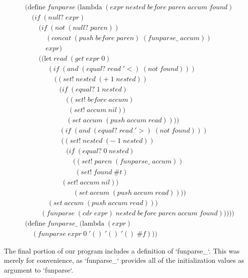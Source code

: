 \begin{align*}
& (\text{define} \; funparse \; (\text{lambda} \; (expr \; nested \; before \; paren \; accum \; found) \; 
\\& \quad (if \; (null? \; expr)
\\& \qquad (if \; (not \; (null? \; paren))
\\& \qquad \quad (concat \; (push \; before \; paren) \; (funparse\_ \; accum))
\\& \qquad \quad expr)
\\& \qquad ((\text{let} \; read \; (get \; expr \; 0)
\\& \qquad \quad \; (if \; (and \; (equal? \; read \; '<) \; (not \; found)))
\\& \qquad \qquad \; ((set! \; nested \; (+ \; 1 \; nested))
\\& \qquad \qquad \quad (if \; (equal? \; 1 \; nested)
\\& \qquad \qquad \qquad ((set! \; before \; accum)
\\& \qquad \qquad \qquad \; (set! \; accum \; nil))
\\& \qquad \qquad \qquad (set \; accum \; (push \; accum \; read))))
\\& \qquad \qquad \quad (if \; (and \; (equal? \; read \; '>) \; (not \; found)))
\\& \qquad \qquad \quad \; ((set! \; nested \; (- \; 1 \; nested))
\\& \qquad \qquad \qquad (if \; (equal? \; 0 \; nested)
\\& \qquad \qquad \qquad \quad ((set! \; paren \; (funparse\_ \; accum))
\\& \qquad \qquad \qquad \quad \; (set! \; found \; \#t)
\\& \qquad \qquad \quad \; (set! \; accum \; nil))
\\& \qquad \qquad \qquad \quad (set \; accum \; (push \; accum \; read))))
\\& \qquad \quad \; (set \; accum \; (push \; accum \; read)))
\\& \qquad \; (funparse \; (cdr \; expr) \; nested \; before \; paren \; accum \; found)))))
\\& (\text{define} \; funparse\_ \; (\text{lambda} \; (expr)
\\& \quad (funparse \; expr \; 0 \; '() \; '() \; '() \; \#f))) \; 
\end{align*}

The final portion of our program includes a definition of `funparse\_`. This was merely 
for convenience, as `funparse\_` provides all of the initialization values as argument 
to `funparse`.

